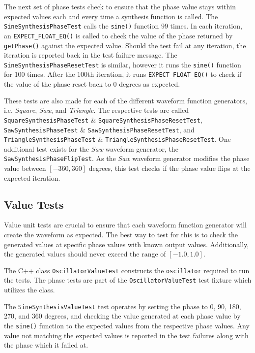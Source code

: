 \documentclass[a4paper,12pt]{report}
\begin{document}
The next set of phase tests check to ensure that the phase value stays within expected values each and every time a synthesis function is called. The \texttt{SineSynthesisPhaseTest} calls the \texttt{sine()} function 99 times. In each iteration, an \texttt{EXPECT\_FLOAT\_EQ()} is called to check the value of the phase returned by \texttt{getPhase()} against the expected value. Should the test fail at any iteration, the iteration is reported back in the test failure message. The \texttt{SineSynthesisPhaseResetTest} is similar, however it runs the \texttt{sine()} function for 100 times. After the 100th iteration, it runs \texttt{EXPECT\_FLOAT\_EQ()} to check if the value of the phase reset back to 0 degrees as expected.

These tests are also made for each of the different waveform function generators, i.e. \emph{Square}, \emph{Saw}, and \emph{Triangle}. The respective tests are called \texttt{SquareSynthesisPhaseTest} \& \texttt{SquareSynthesisPhaseResetTest}, \texttt{SawSynthesisPhaseTest} \& \texttt{SawSynthesisPhaseResetTest}, and \texttt{TriangleSynthesisPhaseTest} \& \texttt{TriangleSynthesisPhaseResetTest}. One additional test exists for the \emph{Saw} waveform generator, the \texttt{SawSynthesisPhaseFlipTest}. As the \emph{Saw} waveform generator modifies the phase value between $[-360,360]$ degrees, this test checks if the phase value flips at the expected iteration.

\subsection{Value Tests}
Value unit tests are crucial to ensure that each waveform function generator will create the waveform as expected. The best way to test for this is to check the generated values at specific phase values with known output values. Additionally, the generated values should never exceed the range of $[-1.0,1.0]$.

The C++ class \texttt{OscillatorValueTest} constructs the \texttt{oscillator} required to run the tests. The phase tests are part of the \texttt{OscillatorValueTest} test fixture which utilizes the class.

The \texttt{SineSynthesisValueTest} test operates by setting the phase to 0, 90, 180, 270, and 360 degrees, and checking the value generated at each phase value by the \texttt{sine()} function to the expected values from the respective phase values. Any value not matching the expected values is reported in the test failures along with the phase which it failed at.
\end{document}
